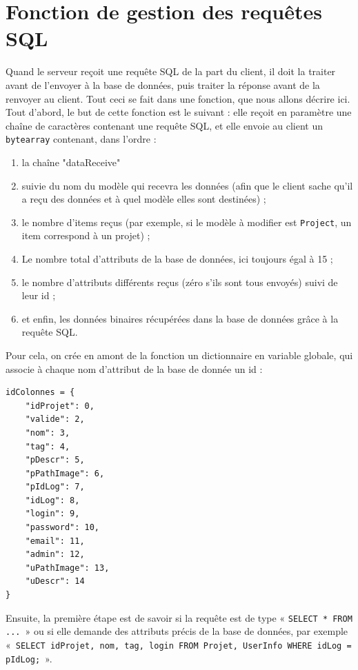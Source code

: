 \documentclass[twoside]{report}
\begin{document}
\section{Fonction de gestion des requêtes SQL}
Quand le serveur reçoit une requête SQL de la part du client, il doit la traiter avant de l'envoyer à la base de données, puis traiter la réponse avant de la renvoyer au client. Tout ceci se fait dans une fonction, que nous allons décrire ici. \\
Tout d'abord, le but de cette fonction est le suivant : elle reçoit en paramètre une chaîne de caractères contenant une requête SQL, et elle envoie au client un \verb!bytearray! contenant, dans l'ordre :
\begin{enumerate}
    \item la chaîne "dataReceive"
    \item suivie du nom du modèle qui recevra les données (afin que le client sache qu'il a reçu des données et à quel modèle elles sont destinées) ;
    \item le nombre d'items reçus (par exemple, si le modèle à modifier est \verb!Project!, un item correspond à un projet) ;
    \item Le nombre total d'attributs de la base de données, ici toujours égal à 15 ;
    \item le nombre d'attributs différents reçus (zéro s'ils sont tous envoyés) suivi de leur id ;
    \item et enfin, les données binaires récupérées dans la base de données grâce à la requête SQL.
\end{enumerate}
Pour cela, on crée en amont de la fonction un dictionnaire en variable globale, qui associe à chaque nom d'attribut de la base de donnée un id :
\begin{lstlisting}[style=py, caption=serveur.py : dictionnaire idColonne, label=idc]
idColonnes = {
    "idProjet": 0,
    "valide": 2,
    "nom": 3,
    "tag": 4,
    "pDescr": 5,
    "pPathImage": 6,
    "pIdLog": 7,
    "idLog": 8,
    "login": 9,
    "password": 10,
    "email": 11,
    "admin": 12,
    "uPathImage": 13,
    "uDescr": 14
}
\end{lstlisting}

Ensuite, la première étape est de savoir si la requête est de type « \verb!SELECT * FROM ...!~» ou si elle demande des attributs précis de la base de données, par exemple «~\verb!SELECT idProjet, nom, tag, login FROM Projet, UserInfo WHERE idLog = pIdLog;!~». \\
\end{document}
